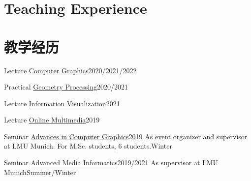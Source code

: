  {
\section{\textbf{Teaching Experience}}
}{
\section{\textbf{教学经历}}
}
\resumeSubHeadingListStartNoLabel
\resumeSubheading
{Lecture \href{http://www.medien.ifi.lmu.de/lehre/ss22/cg1/}{Computer Graphics}}{2020/2021/2022}
{
}{}

\resumeSubheading
{Practical \href{https://www.medien.ifi.lmu.de/lehre/ws2122/gp/}{Geometry Processing}}{2020/2021}
{
}{}

\resumeSubheading
{Lecture \href{https://www.medien.ifi.lmu.de/lehre/ws2122/iv/}{Information Visualization}}{2021}
{
}{}

\resumeSubheading
{Lecture \href{http://www.medien.ifi.lmu.de/lehre/ws1920/omm/}{Online Multimedia}}{2019}
{
}{}

\resumeSubheading
{Seminar \href{http://www.medien.ifi.lmu.de/lehre/ws1920/hs/}{Advances in Computer Graphics}}{2019}
{As event organizer and supervisor at LMU Munich. For M.Sc. students, 6 students.}{Winter}

\resumeSubheading
{Seminar \href{http://www.medien.ifi.lmu.de/lehre/ws2122/hs/}{Advanced Media Informatics}}{2019/2021}
{As supervisor at LMU Munich}{Summer/Winter}

